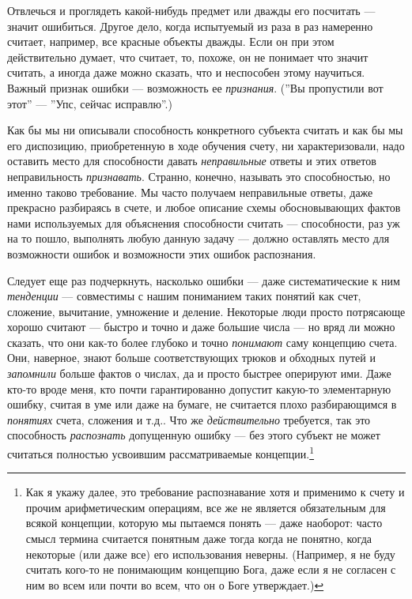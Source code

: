 \documentclass[11pt]{book}
\begin{document}
Отвлечься и проглядеть какой-нибудь предмет или дважды его посчитать --- значит ошибиться. Другое дело, когда испытуемый из раза в раз намеренно считает, например, все красные объекты дважды. Если он при этом действительно думает, что считает, то, похоже, он не понимает что значит считать, а иногда даже можно сказать, что и неспособен этому научиться. Важный признак ошибки --- возможность ее \textit{признания}. (''Вы пропустили вот этот'' --- ''Упс, сейчас исправлю''.)

Как бы мы ни описывали способность конкретного субъекта считать и как бы мы его диспозицию, приобретенную в ходе обучения счету, ни характеризовали, надо оставить место для способности давать \textit{неправильные} ответы и этих ответов неправильность \textit{признавать}. Странно, конечно, называть это способностью, но именно таково требование. Мы часто получаем неправильные ответы, даже прекрасно разбираясь в счете, и любое описание схемы обосновывающих фактов нами используемых для объяснения способности считать --- способности, раз уж на то пошло, выполнять любую данную задачу --- должно оставлять место для возможности ошибок и возможности этих ошибок распознания.

Следует еще раз подчеркнуть, насколько ошибки --- даже систематические к ним \textit{тенденции} --- совместимы с нашим пониманием таких понятий как счет, сложение, вычитание, умножение и деление. Некоторые люди просто потрясающе хорошо считают --- быстро и точно и даже большие числа --- но вряд ли можно сказать, что они как-то более глубоко и точно \textit{понимают} саму концепцию счета. Они, наверное, знают больше соответствующих трюков и обходных путей и \textit{запомнили} больше фактов о числах, да и просто быстрее оперируют ими. Даже кто-то вроде меня, кто почти гарантированно допустит какую-то элементарную ошибку, считая в уме или даже на бумаге, не считается плохо разбирающимся в \textit{понятиях} счета, сложения и т.д.. Что же \textit{действительно} требуется, так это способность \textit{распознать} допущенную ошибку --- без этого субъект не может считаться полностью усвоившим рассматриваемые концепции.\footnote{Как я укажу далее, это требование распознавание хотя и применимо к счету и прочим арифметическим операциям, все же не является обязательным для всякой концепции, которую мы пытаемся понять --- даже наоборот: часто смысл термина считается понятным даже тогда когда не понятно, когда некоторые (или даже все) его использования неверны. (Например, я не буду считать кого-то не понимающим концепцию Бога, даже если я не согласен с ним во всем или почти во всем, что он о Боге утверждает.)}
\end{document}
